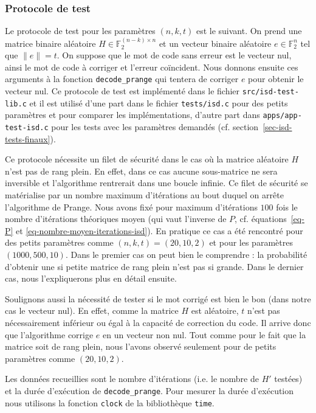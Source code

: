 \documentclass[11pt,a4paper]{article}
\newcommand{\F}{\mathbb{F}_2}
\newcommand{\hw}[1]{\lVert#1\rVert}
\begin{document}
\subsubsection{Protocole de test}
\label{sec-isd-protocole-test}

Le protocole de test pour les paramètres $(n, k, t)$ est le suivant.
On prend une matrice binaire aléatoire $H \in \F^{(n-k)\times n}$ et un vecteur
binaire aléatoire $e \in \F^n$ tel que $\hw{e} = t$.
On suppose que le mot de code sans erreur est le vecteur nul, ainsi le mot de
code à corriger et l'erreur coïncident.
Nous donnons ensuite ces arguments à la fonction \texttt{decode\_prange} qui
tentera de corriger $e$ pour obtenir le vecteur nul.
Ce protocole de test est implémenté dans le fichier \texttt{src/isd-test-lib.c}
et il est utilisé d'une part dans le fichier \texttt{tests/isd.c} pour des petits
paramètres et pour comparer les implémentations, d'autre part dans
\texttt{apps/app-test-isd.c} pour les tests avec les paramètres demandés (cf.
section~\ref{sec-isd-tests-finaux}).

Ce protocole nécessite un filet de sécurité dans le cas où la matrice aléatoire
$H$ n'est pas de rang plein. En effet, dans ce cas aucune sous-matrice ne sera
inversible et l'algorithme rentrerait dans une boucle infinie.
Ce filet de sécurité se matérialise par un nombre maximum d'itérations au bout
duquel on arrête l'algorithme de Prange.
Nous avons fixé pour maximum d'itérations $100$ fois le nombre d'itérations
théoriques moyen (qui vaut l'inverse de $P$, cf. équations~\ref{eq-P} et
\ref{eq-nombre-moyen-iterations-isd}).
En pratique ce cas a été rencontré pour des petits paramètres comme $(n, k, t) =
(20, 10, 2)$ et pour les paramètres $(1000, 500, 10)$. Dans le premier cas on
peut bien le comprendre : la probabilité d'obtenir une si petite matrice de rang
plein n'est pas si grande. Dans le dernier cas, nous l'expliquerons plus en
détail ensuite.

Soulignons aussi la nécessité de tester si le mot corrigé est bien le bon (dans
notre cas le vecteur nul).
En effet, comme la matrice $H$ est aléatoire, $t$ n'est pas nécessairement
inférieur ou égal à la capacité de correction du code.
Il arrive donc que l'algorithme corrige $e$ en un vecteur non nul.
Tout comme pour le fait que la matrice soit de rang plein, nous l'avons observé
seulement pour de petits paramètres comme $(20, 10, 2)$.

Les données recueillies sont le nombre d'itérations (i.e. le nombre de $H'$
testées) et la durée d'exécution de \texttt{decode\_prange}.
Pour mesurer la durée d'exécution nous utilisons la fonction \texttt{clock} de
la bibliothèque \texttt{time}.
\end{document}
